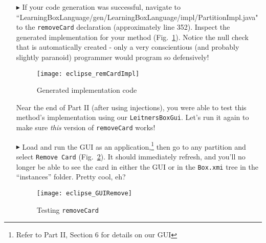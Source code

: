 \begin{itemize}

\item[$\blacktriangleright$] If your code generation was successful, navigate to
``Learning\-Box\-Language/\-gen/\-Learning\-Box\-Language/\-impl/\-Partition\-Impl.java" to the \texttt{\-remove\-Card} declaration (approximately line 352).
Inspect the generated implementation for your method (Fig.~\ref{fig:remCardImpl}). Notice the null check that is automatically created - only a very
conscientious (and probably slightly paranoid) programmer would program so defensively!

\vspace{0.5cm}

\begin{figure}[htp]
\begin{center}
  \texttt{[image: eclipse\_remCardImpl]}
  \caption{Generated implementation code}
  \label{fig:remCardImpl}
\end{center}
\end{figure}

\newpage

Near the end of Part II (after using injections), you were able to test this method's implementation using our \texttt{LeitnersBoxGui}. Let's run it again to
make sure \emph{this} version of \texttt{removeCard} works!

\item[$\blacktriangleright$] Load and run the GUI as an application,\footnote{Refer to Part II, Section 6 for details on our GUI} then go to any partition and
select \texttt{Remove Card} (Fig.~\ref{fig:GUIRemCard}).
It should immediately refresh, and you'll no longer be able to see the card in either the GUI or in the \texttt{Box.xmi} tree in the ``instances'' folder.
Pretty cool, eh?

\vspace{1cm}

\begin{figure}[htp]
\begin{center}
  \texttt{[image: eclipse\_GUIRemove]}
  \caption{Testing \texttt{removeCard}}
  \label{fig:GUIRemCard}
\end{center}
\end{figure}

\end{itemize}